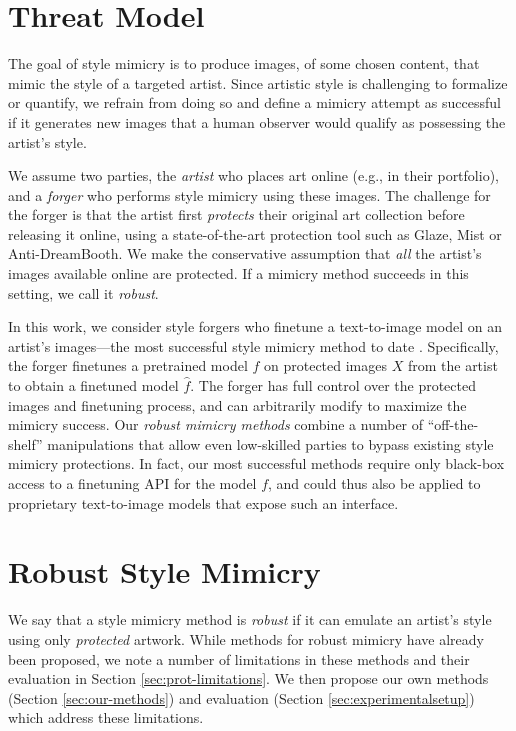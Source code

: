 \documentclass{article}
\begin{document}
\section{Threat Model} 
\label{sec:attackscenario}

The goal of style mimicry is to produce images, of some chosen content, that mimic the style of a targeted artist.
Since artistic style is challenging to formalize or quantify, we refrain from doing so and define a mimicry attempt as successful if it generates new images that a human observer would qualify as 
possessing the artist's style.

We assume two parties, the \emph{artist} who places art online (e.g., in their portfolio), and a \emph{forger} who performs style mimicry using these images.
The challenge for the forger is that the artist first \emph{protects} their original art collection before releasing it online, using a state-of-the-art protection tool such as Glaze, Mist or Anti-DreamBooth.
We make the conservative assumption that \emph{all} the artist's images available online are protected. If a mimicry method succeeds in this setting, we call it \emph{robust}.

In this work, we consider style forgers who finetune a text-to-image model on an artist's images---the most successful style mimicry method to date \citep{glaze}.
Specifically, the forger finetunes a pretrained model $f$ on protected images $X$ from the artist to obtain a finetuned model $\hat{f}$.
The forger has full control over the protected images and finetuning process, and can arbitrarily modify to maximize the mimicry success. %
Our \emph{robust mimicry methods} combine a number of ``off-the-shelf'' manipulations that allow even low-skilled parties to bypass existing style mimicry protections.
In fact, our most successful methods require only black-box access to a finetuning API for the model $f$, and could thus also be applied to proprietary text-to-image models that expose such an interface. 


\section{Robust Style Mimicry}
We say that a style mimicry method is \emph{robust} if it can emulate an artist's style using only \emph{protected} artwork. 
While methods for robust mimicry have already been proposed, we note a number of limitations in these methods and their evaluation in Section \ref{sec:prot-limitations}.
We then propose our own methods (Section \ref{sec:our-methods}) and evaluation (Section \ref{sec:experimentalsetup}) which address these limitations.
\end{document}
